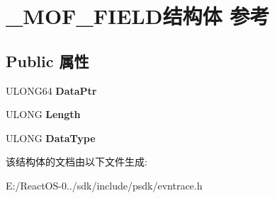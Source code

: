 \hypertarget{struct___m_o_f___f_i_e_l_d}{}\section{\+\_\+\+M\+O\+F\+\_\+\+F\+I\+E\+L\+D结构体 参考}
\label{struct___m_o_f___f_i_e_l_d}
\subsection*{Public 属性}
\begin{DoxyCompactItemize}
\item 
\mbox{\label{struct___m_o_f___f_i_e_l_d_af593c425ab31f6198f4a065a98c18054}} 
U\+L\+O\+N\+G64 {\bfseries Data\+Ptr}
\item 
\mbox{\label{struct___m_o_f___f_i_e_l_d_afe293b6596132fc931536fc0df08f1a3}} 
U\+L\+O\+NG {\bfseries Length}
\item 
\mbox{\label{struct___m_o_f___f_i_e_l_d_a065edab1256c8543e49db2c022cde493}} 
U\+L\+O\+NG {\bfseries Data\+Type}
\end{DoxyCompactItemize}


该结构体的文档由以下文件生成\+:\begin{DoxyCompactItemize}
\item 
E\+:/\+React\+O\+S-\/0../sdk/include/psdk/evntrace.\+h\end{DoxyCompactItemize}
